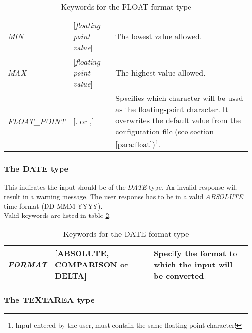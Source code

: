 \documentclass[a4paper]{book}
\begin{document}
\begin{table}[h!tb]
\begin{minipage}[h!tb]{\textwidth}
\begin{tabular}{llp{6cm}} \hline
\textsl{MIN} & [\textit{floating point value}] & The lowest value allowed. \\
\textsl{MAX} & [\textit{floating point value}] & The highest value allowed. \\
\textsl{FLOAT\_POINT} & [\textsf{.} or \textsf{,}]&  Specifies which character will be used as the floating-point 
character. It overwrites the default value from the configuration 
file (see section \ref{para:float})\footnote{ Input entered by the user, must contain the same floating-point 
character!}.\\ \hline
\end{tabular}
\caption{Keywords for the FLOAT format type}\label{tab:float}
\end{minipage}
\end{table}

\subsubsection{The DATE type}

This indicates the input should be of the \textsl{DATE} type. An invalid response 
will result in a warning message. The user response has to be in a valid 
\textsl{ABSOLUTE} time format (DD-MMM-YYYY). \\
Valid keywords are listed in table \ref{tab:date}.

\begin{table}[h!tb]
\begin{minipage}[h!tb]{\textwidth}
\begin{tabular}{llp{4cm}} \hline
\textsl{FORMAT} & [\textsf{ABSOLUTE}, \textsf{COMPARISON} or \textsf{DELTA}] & Specify the format to which the input will be converted.\\ \hline
\end{tabular}
\caption{Keywords for the DATE format type}\label{tab:date}
\end{minipage}
\end{table}

\subsubsection{The TEXTAREA type}
\label{para:mylabel5}
\end{document}
